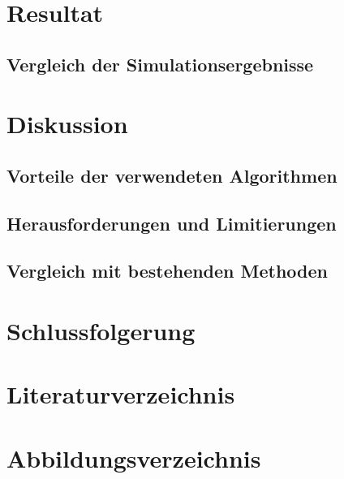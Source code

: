 \documentclass[a4paper,12pt,twoside]{article}
\begin{document}
\section{Resultat}
\subsection{Vergleich der Simulationsergebnisse}

\section{Diskussion}
\subsection{Vorteile der verwendeten Algorithmen}
\subsection{Herausforderungen und Limitierungen}
\subsection{Vergleich mit bestehenden Methoden}

\section{Schlussfolgerung}
\section{Literaturverzeichnis}
\section{Abbildungsverzeichnis}
\end{document}

